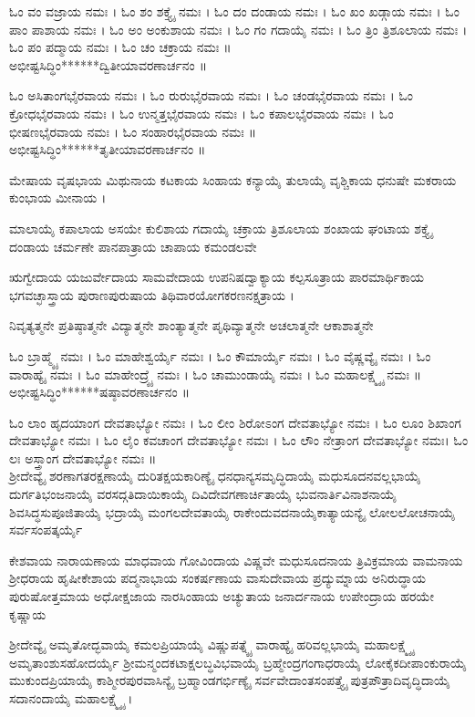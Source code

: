 ಓಂ ವಂ ವಜ್ರಾಯ ನಮಃ । ಓಂ ಶಂ ಶಕ್ತ್ಯೈ ನಮಃ । ಓಂ ದಂ ದಂಡಾಯ ನಮಃ । ಓಂ ಖಂ ಖಡ್ಗಾಯ ನಮಃ । ಓಂ ಪಾಂ ಪಾಶಾಯ ನಮಃ । ಓಂ ಅಂ ಅಂಕುಶಾಯ ನಮಃ । ಓಂ ಗಂ ಗದಾಯೈ ನಮಃ । ಓಂ  ತ್ರಿಂ  ತ್ರಿಶೂಲಾಯ ನಮಃ । ಓಂ ಪಂ ಪದ್ಮಾಯ ನಮಃ । ಓಂ ಚಂ ಚಕ್ರಾಯ ನಮಃ ॥\\
ಅಭೀಷ್ಟಸಿದ್ಧಿಂ******ದ್ವಿತೀಯಾವರಣಾರ್ಚನಂ ॥

ಓಂ ಅಸಿತಾಂಗಭೈರವಾಯ ನಮಃ । ಓಂ ರುರುಭೈರವಾಯ ನಮಃ । ಓಂ ಚಂಡಭೈರವಾಯ ನಮಃ । ಓಂ ಕ್ರೋಧಭೈರವಾಯ ನಮಃ । ಓಂ ಉನ್ಮತ್ತಭೈರವಾಯ ನಮಃ । ಓಂ ಕಪಾಲಭೈರವಾಯ ನಮಃ । ಓಂ ಭೀಷಣಭೈರವಾಯ ನಮಃ । ಓಂ ಸಂಹಾರಭೈರವಾಯ ನಮಃ ॥\\%
ಅಭೀಷ್ಟಸಿದ್ಧಿಂ******ತೃತೀಯಾವರಣಾರ್ಚನಂ ॥

ಮೇಷಾಯ ವೃಷಭಾಯ ಮಿಥುನಾಯ ಕಟಕಾಯ ಸಿಂಹಾಯ ಕನ್ಯಾಯೈ ತುಲಾಯೈ ವೃಶ್ಚಿಕಾಯ ಧನುಷೇ ಮಕರಾಯ ಕುಂಭಾಯ ಮೀನಾಯ ।

ಮಾಲಾಯೈ ಕಪಾಲಾಯ ಅಸಯೇ ಕುಲಿಶಾಯ ಗದಾಯೈ ಚಕ್ರಾಯ ತ್ರಿಶೂಲಾಯ ಶಂಖಾಯ ಘಂಟಾಯ ಶಕ್ತ್ಯೈ ದಂಡಾಯ ಚರ್ಮಣೇ ಪಾನಪಾತ್ರಾಯ ಚಾಪಾಯ ಕಮಂಡಲವೇ

ಋಗ್ವೇದಾಯ ಯಜುರ್ವೇದಾಯ ಸಾಮವೇದಾಯ ಉಪನಿಷದ್ವಾಕ್ಯಾಯ ಕಲ್ಪಸೂತ್ರಾಯ ಪಾರಮಾರ್ಥಿಕಾಯ ಭಗವಚ್ಛಾಸ್ತ್ರಾಯ ಪುರಾಣಪುರುಷಾಯ ತಿಥಿವಾರಯೋಗಕರಣನಕ್ಷತ್ರಾಯ ।

ನಿವೃತ್ಯತ್ಮನೇ ಪ್ರತಿಷ್ಠಾತ್ಮನೇ ವಿದ್ಯಾತ್ಮನೇ ಶಾಂತ್ಯಾತ್ಮನೇ ಪೃಥಿವ್ಯಾತ್ಮನೇ ಅಚಲಾತ್ಮನೇ ಆಕಾಶಾತ್ಮನೇ 

ಓಂ ಬ್ರಾಹ್ಮ್ಯೈ ನಮಃ । ಓಂ ಮಾಹೇಶ್ವರ್ಯೈ ನಮಃ । ಓಂ ಕೌಮಾರ್ಯೈ ನಮಃ । ಓಂ ವೈಷ್ಣವ್ಯೈ ನಮಃ । ಓಂ ವಾರಾಹ್ಯೈ ನಮಃ । ಓಂ ಮಾಹೇಂದ್ರ್ಯೈ ನಮಃ । ಓಂ ಚಾಮುಂಡಾಯೈ ನಮಃ । ಓಂ ಮಹಾಲಕ್ಷ್ಮ್ಯೈ ನಮಃ ॥\\
ಅಭೀಷ್ಟಸಿದ್ಧಿಂ******ಷಷ್ಠಾವರಣಾರ್ಚನಂ ॥


ಓಂ ಲಾಂ ಹೃದಯಾಂಗ ದೇವತಾಭ್ಯೋ ನಮಃ । ಓಂ ಲೀಂ ಶಿರೋಽಂಗ ದೇವತಾಭ್ಯೋ ನಮಃ । ಓಂ ಲೂಂ ಶಿಖಾಂಗ ದೇವತಾಭ್ಯೋ ನಮಃ । ಓಂ ಲೈಂ ಕವಚಾಂಗ ದೇವತಾಭ್ಯೋ ನಮಃ । ಓಂ ಲೌಂ ನೇತ್ರಾಂಗ ದೇವತಾಭ್ಯೋ ನಮಃ। ಓಂ ಲಃ ಅಸ್ತ್ರಾಂಗ ದೇವತಾಭ್ಯೋ ನಮಃ ॥\\

ಶ್ರೀದೇವ್ಯೈ ಶರಣಾಗತರಕ್ಷಣಾಯೈ ದುರಿತಕ್ಷಯಕಾರಿಣ್ಯೈ ಧನಧಾನ್ಯಸಮೃದ್ಧಿದಾಯೈ ಮಧುಸೂದನವಲ್ಲಭಾಯೈ ದುರ್ಗತಿಭಂಜನಾಯೈ ವರಸದ್ಗತಿದಾಯಿಕಾಯೈ ದಿವಿದೇವಗಣಾರ್ಚಿತಾಯೈ ಭುವನಾರ್ತಿವಿನಾಶನಾಯೈ ಶಿವಸಿದ್ಧಸುಪೂಜಿತಾಯೈ ಭದ್ರಾಯೈ ಮಂಗಲದೇವತಾಯೈ ರಾಕೇಂದುವದನಾಯೈಕಾತ್ಯಾಯನ್ಯೈ ಲೋಲಲೋಚನಾಯೈ ಸರ್ವಸಂಪತ್ಕರ್ಯೈ

ಕೇಶವಾಯ ನಾರಾಯಣಾಯ ಮಾಧವಾಯ ಗೋವಿಂದಾಯ ವಿಷ್ಣವೇ ಮಧುಸೂದನಾಯ ತ್ರಿವಿಕ್ರಮಾಯ ವಾಮನಾಯ ಶ್ರೀಧರಾಯ ಹೃಷೀಕೇಶಾಯ ಪದ್ಮನಾಭಾಯ ಸಂಕರ್ಷಣಾಯ ವಾಸುದೇವಾಯ ಪ್ರದ್ಯುಮ್ನಾಯ ಅನಿರುದ್ಧಾಯ ಪುರುಷೋತ್ತಮಾಯ ಅಧೋಕ್ಷಜಾಯ  ನಾರಸಿಂಹಾಯ ಅಚ್ಯುತಾಯ ಜನಾರ್ದನಾಯ ಉಪೇಂದ್ರಾಯ ಹರಯೇ ಕೃಷ್ಣಾಯ 


ಶ್ರೀದೇವ್ಯೈ ಅಮೃತೋದ್ಭವಾಯೈ ಕಮಲಪ್ರಿಯಾಯೈ ವಿಷ್ಣುಪತ್ನ್ಯೈ ವಾರಾಹ್ಯೈ ಹರಿವಲ್ಲಭಾಯೈ ಮಹಾಲಕ್ಷ್ಮ್ಯೈ ಅಮೃತಾಂಶುಸಹೋದರ್ಯೈ ಶ್ರೀಮನ್ಮಂದಕಟಾಕ್ಷಲಬ್ಧವಿಭವಾಯೈ ಬ್ರಹ್ಮೇಂದ್ರಗಂಗಾಧರಾಯೈ ಲೋಕೈಕದೀಪಾಂಕುರಾಯೈ ಮುಕುಂದಪ್ರಿಯಾಯೈ ಕಾಶ್ಮೀರಪುರವಾಸಿನ್ಯೈ ಬ್ರಹ್ಮಾಂಡಗರ್ಭಿಣ್ಯೈ ಸರ್ವವೇದಾಂತಸಂಪತ್ತ್ಯೈ ಪುತ್ರಪೌತ್ರಾದಿವೃದ್ಧಿದಾಯೈ ಸದಾನಂದಾಯೈ ಮಹಾಲಕ್ಷ್ಮ್ಯೈ ।



